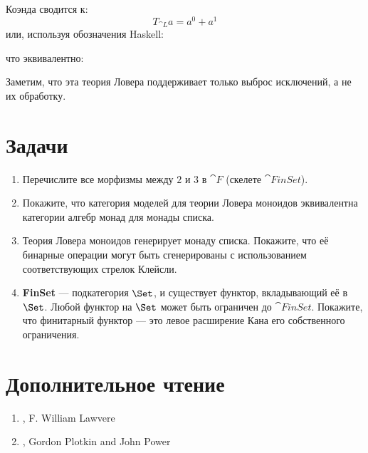 \begin{figure}[H]
  \centering
\end{figure}

\noindent
Коэнда сводится к:
\[T_{\cat{L}} a = a^0 + a^1\]
или, используя обозначения Haskell:

что эквивалентно:

Заметим, что эта теория Ловера поддерживает только выброс исключений,
а не их обработку.

\section{Задачи}

\begin{enumerate}
  \tightlist
  \item
        Перечислите все морфизмы между $2$ и $3$ в $\cat{F}$ (скелете
        $\cat{FinSet}$).
  \item
        Покажите, что категория моделей для теории Ловера моноидов
        эквивалентна категории алгебр монад для монады списка.
  \item
        Теория Ловера моноидов генерирует монаду списка. Покажите, что её
        бинарные операции могут быть сгенерированы с использованием соответствующих стрелок
        Клейсли.
  \item
        \textbf{FinSet} — подкатегория $\Set$, и существует
        функтор, вкладывающий её в $\Set$. Любой функтор на $\Set$
        может быть ограничен до $\cat{FinSet}$. Покажите, что финитарный функтор —
        это левое расширение Кана его собственного ограничения.
\end{enumerate}

\section{Дополнительное чтение}
\begin{enumerate}
  \tightlist
  \item
        , F. William Lawvere
  \item
        , Gordon Plotkin and John Power
\end{enumerate}
